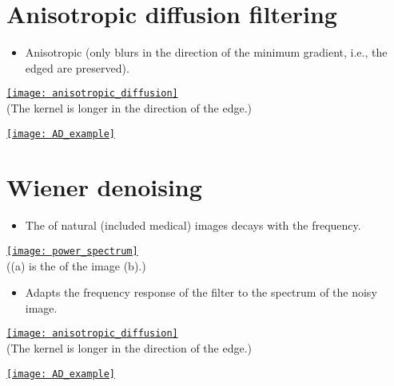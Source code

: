 \section{Anisotropic diffusion filtering}
\begin{itemize}
\item Anisotropic (only blurs in the direction of the minimum
  gradient, i.e., the edged are preserved).
\end{itemize}
\begin{center}
  \href{https://dsp.stackexchange.com/questions/14606/anisotropic-diffusion}{\texttt{[image: anisotropic\_diffusion]}}\\
  (The kernel is longer in the direction of the edge.)
\end{center}
\begin{center}
    \href{https://es.mathworks.com/help/images/ref/imdiffusefilt.html}{\texttt{[image: AD\_example]}}
\end{center}

\section{Wiener denoising}
\begin{itemize}
\item The  of natural (included medical) images
  decays with the frequency.
\end{itemize}
\begin{center}
  \href{https://developer.nvidia.com/gpugems/gpugems2/part-vi-simulation-and-numerical-algorithms/chapter-48-medical-image-reconstruction}{\texttt{[image: power\_spectrum]}}\\
  ((a) is the  of the image (b).)
\end{center}
\begin{itemize}
\item Adapts the frequency response of the filter to the spectrum of the noisy image.
\end{itemize}
\begin{center}
  \href{https://dsp.stackexchange.com/questions/14606/anisotropic-diffusion}{\texttt{[image: anisotropic\_diffusion]}}\\
  (The kernel is longer in the direction of the edge.)
\end{center}
\begin{center}
    \href{https://www.cloudfactory.com/blog/gaussian-noise-medical-ai}{\texttt{[image: AD\_example]}}
\end{center}


